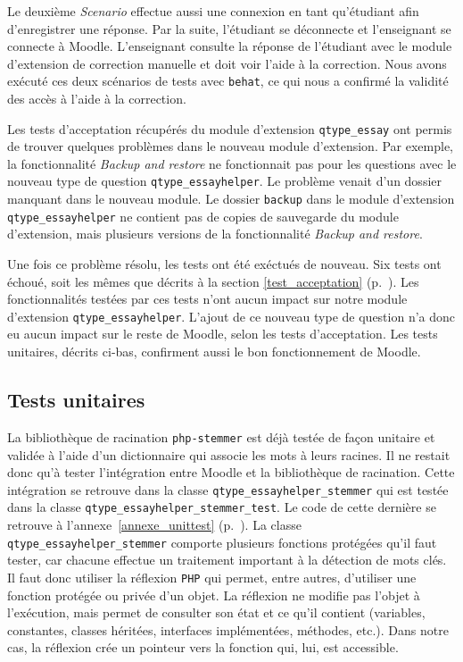 
Le deuxi\`eme \textit{Scenario} effectue aussi une connexion en tant qu'\'etudiant afin d'enregistrer une r\'eponse.
Par la suite, l'\'etudiant se d\'econnecte et l'enseignant se connecte à Moodle.
L'enseignant consulte la r\'eponse de l'\'etudiant avec le module d'extension de correction manuelle et doit voir l'aide \`a la correction.
Nous avons ex\'ecut\'e ces deux sc\'enarios de tests avec \texttt{behat}, ce qui nous a confirm\'e la validit\'e des acc\`es \`a l'aide \`a la correction.

Les tests d'acceptation r\'ecup\'er\'es du module d'extension \texttt{qtype\_essay} ont permis de trouver quelques probl\`emes  dans le nouveau module d'extension.
Par exemple, la fonctionnalit\'e \textit{Backup and restore} ne fonctionnait pas pour les questions avec le nouveau type de question \texttt{qtype\_essayhelper}.
Le probl\`eme venait d'un dossier manquant dans le nouveau module.
Le dossier \texttt{backup} dans le module d'extension \texttt{qtype\_essayhelper} ne contient pas de copies de sauvegarde du module d'extension, mais plusieurs versions de la fonctionnalit\'e \textit{Backup and restore}.

Une fois ce probl\`eme r\'esolu, les tests ont \'et\'e ex\'ectu\'es de nouveau. Six tests ont \'echou\'e, soit les m\^emes que d\'ecrits \`a la section \ref{test_acceptation} (p.~\pageref{test_acceptation}).
Les fonctionnalit\'es test\'ees par ces tests n'ont aucun impact sur notre module d'extension \texttt{qtype\_essayhelper}.
L'ajout de ce nouveau type de question n'a donc eu aucun impact sur le reste de Moodle, selon les tests d'acceptation.
Les tests unitaires, d\'ecrits ci-bas, confirment aussi le bon fonctionnement de Moodle.

\subsection{Tests unitaires} \label{dev_test_unitaire}
La biblioth\`eque de racination \texttt{php-stemmer} est d\'ej\`a test\'ee de fa\c{c}on unitaire et valid\'ee \`a l'aide d'un dictionnaire qui associe les mots \`a leurs racines.
Il ne restait donc qu'\`a tester l'int\'egration entre Moodle et la biblioth\`eque de racination.
Cette int\'egration se retrouve dans la classe \texttt{qtype\_essayhelper\_stemmer} qui est test\'ee dans la classe \texttt{qtype\_essayhelper\_stemmer\_test}.
Le code de cette derni\`ere se retrouve \`a l'annexe~\ref{annexe_unittest} (p.~\pageref{annexe_unittest}).
La classe \texttt{qtype\_essayhelper\_stemmer} comporte plusieurs fonctions prot\'eg\'ees qu'il faut tester, car chacune effectue un traitement important \`a la d\'etection de mots cl\'es.
Il faut donc utiliser la r\'eflexion \texttt{PHP} qui permet, entre autres, d'utiliser une fonction prot\'eg\'ee ou priv\'ee d'un objet.
La r\'eflexion ne modifie pas l'objet \`a l'ex\'ecution, mais permet de consulter son \'etat et ce qu'il contient (variables, constantes, classes h\'erit\'ees, interfaces impl\'ement\'ees, m\'ethodes, etc.).
Dans notre cas, la r\'eflexion cr\'ee un pointeur vers la fonction qui, lui, est accessible.


